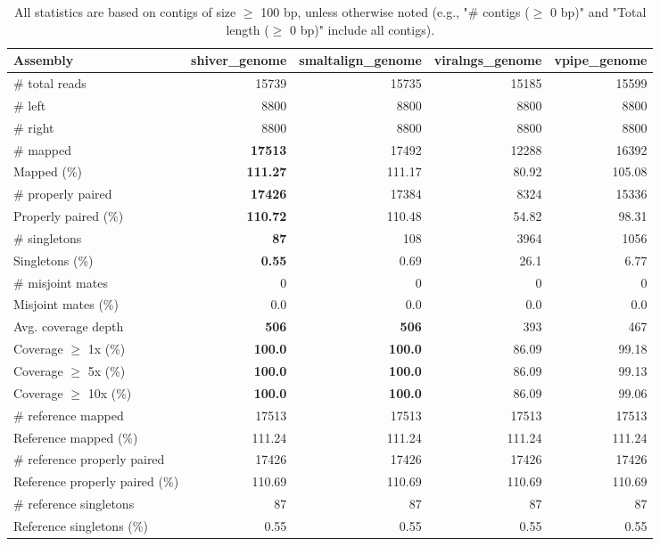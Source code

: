 \documentclass[12pt,a4paper]{article}
\begin{document}
\begin{table}[ht]
\begin{center}
\caption{All statistics are based on contigs of size $\geq$ 100 bp, unless otherwise noted (e.g., "\# contigs ($\geq$ 0 bp)" and "Total length ($\geq$ 0 bp)" include all contigs).}
\begin{tabular}{|l*{4}{|r}|}
\hline
Assembly & shiver\_genome & smaltalign\_genome & viralngs\_genome & vpipe\_genome \\ \hline
\# total reads & 15739 & 15735 & 15185 & 15599 \\ \hline
\# left & 8800 & 8800 & 8800 & 8800 \\ \hline
\# right & 8800 & 8800 & 8800 & 8800 \\ \hline
\# mapped & {\bf 17513} & 17492 & 12288 & 16392 \\ \hline
Mapped (\%) & {\bf 111.27} & 111.17 & 80.92 & 105.08 \\ \hline
\# properly paired & {\bf 17426} & 17384 & 8324 & 15336 \\ \hline
Properly paired (\%) & {\bf 110.72} & 110.48 & 54.82 & 98.31 \\ \hline
\# singletons & {\bf 87} & 108 & 3964 & 1056 \\ \hline
Singletons (\%) & {\bf 0.55} & 0.69 & 26.1 & 6.77 \\ \hline
\# misjoint mates & 0 & 0 & 0 & 0 \\ \hline
Misjoint mates (\%) & 0.0 & 0.0 & 0.0 & 0.0 \\ \hline
Avg. coverage depth & {\bf 506} & {\bf 506} & 393 & 467 \\ \hline
Coverage $\geq$ 1x (\%) & {\bf 100.0} & {\bf 100.0} & 86.09 & 99.18 \\ \hline
Coverage $\geq$ 5x (\%) & {\bf 100.0} & {\bf 100.0} & 86.09 & 99.13 \\ \hline
Coverage $\geq$ 10x (\%) & {\bf 100.0} & {\bf 100.0} & 86.09 & 99.06 \\ \hline
\# reference mapped & 17513 & 17513 & 17513 & 17513 \\ \hline
Reference mapped (\%) & 111.24 & 111.24 & 111.24 & 111.24 \\ \hline
\# reference properly paired & 17426 & 17426 & 17426 & 17426 \\ \hline
Reference properly paired (\%) & 110.69 & 110.69 & 110.69 & 110.69 \\ \hline
\# reference singletons & 87 & 87 & 87 & 87 \\ \hline
Reference singletons (\%) & 0.55 & 0.55 & 0.55 & 0.55 \\ \hline

\end{tabular}
\end{center}
\end{table}
\end{document}
